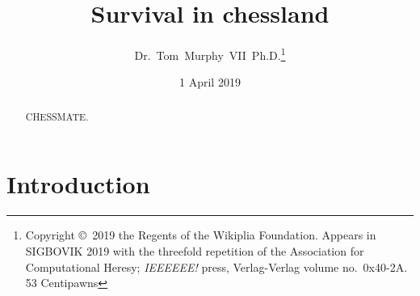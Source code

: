 \documentclass[twocolumn]{article}
\begin{document}
 

\title{Survival in chessland}
\author{Dr.~Tom~Murphy~VII~Ph.D.\footnote{
Copyright \copyright\ 2019 the Regents of the Wikiplia
Foundation. Appears in SIGBOVIK 2019 with the threefold
repetition of the Association for Computational Heresy; 
{\em IEEEEEE!} press, Verlag-Verlag volume no.~0x40-2A.
53 Centipawns} }


\newcommand\checkmate{\hspace{-.05em}\raisebox{.4ex}{\tiny\bf ++}}

\renewcommand\th{\ensuremath{{}^{\textrm{th}}}}
\newcommand\st{\ensuremath{{}^{\textrm{st}}}}
\newcommand\rd{\ensuremath{{}^{\textrm{rd}}}}
\newcommand\nd{\ensuremath{{}^{\textrm{nd}}}}
\newcommand\at{\ensuremath{\scriptstyle @}}

\date{1 April 2019}

\maketitle \thispagestyle{empty}

\begin{abstract}
CHESSMATE.
\end{abstract}

\section*{Introduction}
\end{document}
